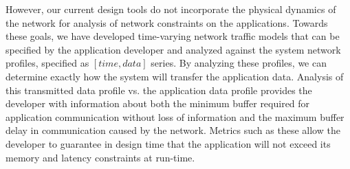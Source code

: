 
However, our current design tools do not incorporate the physical
dynamics of the network for analysis of network constraints on the
applications.  Towards these goals, we have developed time-varying
network traffic models that can be specified by the application
developer and analyzed against the system network profiles, specified
as $[time,data]$ series. By analyzing these profiles, we can determine
exactly how the system will transfer the application data. Analysis of
this transmitted data profile vs. the application data profile
provides the developer with information about both the minimum buffer
required for application communication without loss of information and
the maximum buffer delay in communication caused by the network.
Metrics such as these allow the developer to guarantee in design time
that the application will not exceed its memory and latency
constraints at run-time.

\fi
